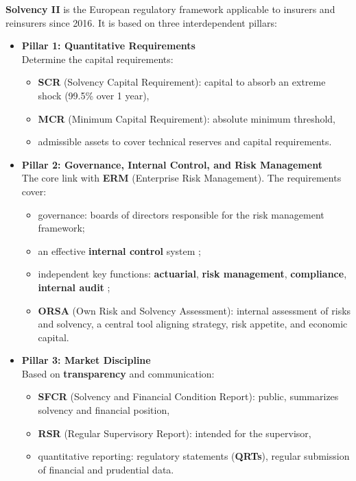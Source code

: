 	
\begin{f}
	
	\textbf{Solvency II} is the European regulatory framework applicable to insurers and reinsurers since 2016. It is based on three interdependent pillars:
	
	\begin{itemize}
		\item \textbf{Pillar 1: Quantitative Requirements} \\
		Determine the capital requirements:
		\begin{itemize}
			\item \textbf{SCR} (Solvency Capital Requirement): capital to absorb an extreme shock (99.5\% over 1 year),
			\item \textbf{MCR} (Minimum Capital Requirement): absolute minimum threshold,
			\item admissible assets to cover technical reserves and capital requirements.
		\end{itemize}
		
		\item \textbf{Pillar 2: Governance, Internal Control, and Risk Management} \\
		The core link with \textbf{ERM} (Enterprise Risk Management). The requirements cover:
		\begin{itemize}
			\item governance: boards of directors responsible for the risk management framework;
			\item an effective \textbf{internal control} system ;
			\item independent key functions: \textbf{actuarial}, \textbf{risk management}, \textbf{compliance}, \textbf{internal audit} ;
			\item \textbf{ORSA} (Own Risk and Solvency Assessment): internal assessment of risks and solvency, a central tool aligning strategy, risk appetite, and economic capital.
		\end{itemize}
		
		\item \textbf{Pillar 3: Market Discipline} \\
		Based on \textbf{transparency} and communication:
		\begin{itemize}
			\item \textbf{SFCR} (Solvency and Financial Condition Report): public, summarizes solvency and financial position,
			\item \textbf{RSR} (Regular Supervisory Report): intended for the supervisor,
			\item quantitative reporting: regulatory statements (\textbf{QRTs}), regular submission of financial and prudential data.
		\end{itemize}
	\end{itemize}
		
\end{f}
